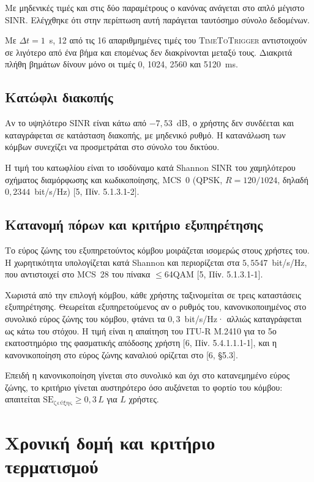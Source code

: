 \documentclass[11pt,a4paper]{article}
\begin{document}
Με μηδενικές τιμές και στις δύο παραμέτρους ο κανόνας ανάγεται στο απλό μέγιστο
SINR. Ελέγχθηκε ότι στην περίπτωση αυτή παράγεται ταυτόσημο σύνολο δεδομένων.

Με $\Delta t = 1$~s, 12 από τις 16 απαριθμημένες τιμές του \textsc{TimeToTrigger}
αντιστοιχούν σε λιγότερο από ένα βήμα και επομένως δεν διακρίνονται μεταξύ τους.
Διακριτά πλήθη βημάτων δίνουν μόνο οι τιμές 0, 1024, 2560 και 5120~ms.

\subsection{Κατώφλι διακοπής}

Αν το υψηλότερο SINR είναι κάτω από $-7{,}53$~dB, ο χρήστης δεν συνδέεται και
καταγράφεται σε κατάσταση διακοπής, με μηδενικό ρυθμό. Η κατανάλωση των κόμβων
συνεχίζει να προσμετράται στο σύνολο του δικτύου.

Η τιμή του κατωφλίου είναι το ισοδύναμο κατά Shannon SINR του χαμηλότερου
σχήματος διαμόρφωσης και κωδικοποίησης, MCS~0 (QPSK, $R = 120/1024$, δηλαδή
$0{,}2344$~bit/s/Hz) [5, Πίν. 5.1.3.1-2].

\subsection{Κατανομή πόρων και κριτήριο εξυπηρέτησης}

Το εύρος ζώνης του εξυπηρετούντος κόμβου μοιράζεται ισομερώς στους χρήστες του.
Η χωρητικότητα υπολογίζεται κατά Shannon και περιορίζεται στα
$5{,}5547$~bit/s/Hz, που αντιστοιχεί στο MCS~28 του πίνακα $\le$64QAM
[5, Πίν. 5.1.3.1-1].

Χωριστά από την επιλογή κόμβου, κάθε χρήστης ταξινομείται σε τρεις καταστάσεις
εξυπηρέτησης. Θεωρείται εξυπηρετούμενος αν ο ρυθμός του, κανονικοποιημένος στο
συνολικό εύρος ζώνης του κόμβου, φτάνει τα $0{,}3$~bit/s/Hz· αλλιώς
καταγράφεται ως κάτω του στόχου. Η τιμή είναι η απαίτηση του ITU-R M.2410 για
το 5ο εκατοστημόριο της φασματικής απόδοσης χρήστη [6, Πίν. 5.4.1.1.1-1], και η
κανονικοποίηση στο εύρος ζώνης καναλιού ορίζεται στο [6, §5.3].

Επειδή η κανονικοποίηση γίνεται στο συνολικό και όχι στο κατανεμημένο εύρος
ζώνης, το κριτήριο γίνεται αυστηρότερο όσο αυξάνεται το φορτίο του κόμβου:
απαιτείται $\mathrm{SE}_{\text{ζεύξης}} \ge 0{,}3\,L$ για $L$ χρήστες.

\section{Χρονική δομή και κριτήριο τερματισμού}
\end{document}
